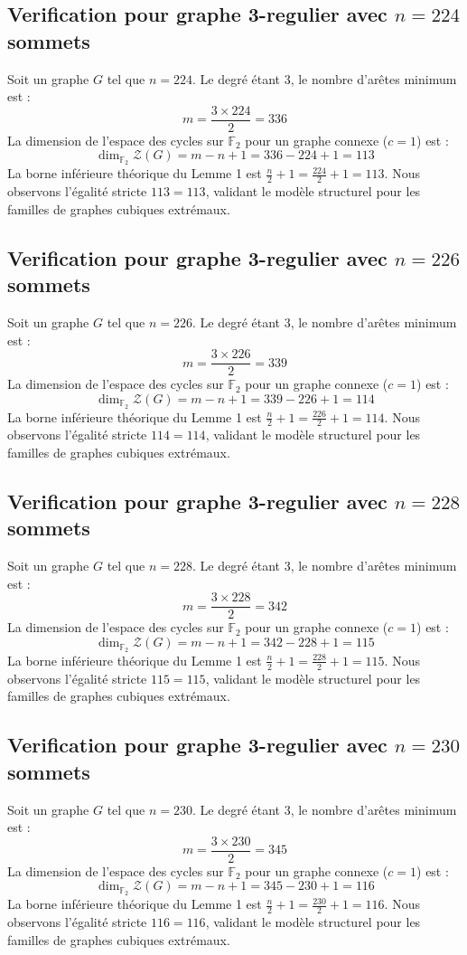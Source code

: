 \documentclass[11pt,a4paper]{article}
\begin{document}
\subsection{Verification pour graphe 3-regulier avec $n=224$ sommets}
Soit un graphe $G$ tel que $n = 224$. Le degré étant 3, le nombre d'arêtes minimum est :
$$ m = \frac{3 \times 224}{2} = 336 $$
La dimension de l'espace des cycles sur $\mathbb{F}_2$ pour un graphe connexe ($c=1$) est :
$$ \dim_{\mathbb{F}_2} \mathcal{Z}(G) = m - n + 1 = 336 - 224 + 1 = 113 $$
La borne inférieure théorique du Lemme 1 est $\frac{n}{2} + 1 = \frac{224}{2} + 1 = 113$.
Nous observons l'égalité stricte $113 = 113$, validant le modèle structurel pour les familles de graphes cubiques extrémaux.

\subsection{Verification pour graphe 3-regulier avec $n=226$ sommets}
Soit un graphe $G$ tel que $n = 226$. Le degré étant 3, le nombre d'arêtes minimum est :
$$ m = \frac{3 \times 226}{2} = 339 $$
La dimension de l'espace des cycles sur $\mathbb{F}_2$ pour un graphe connexe ($c=1$) est :
$$ \dim_{\mathbb{F}_2} \mathcal{Z}(G) = m - n + 1 = 339 - 226 + 1 = 114 $$
La borne inférieure théorique du Lemme 1 est $\frac{n}{2} + 1 = \frac{226}{2} + 1 = 114$.
Nous observons l'égalité stricte $114 = 114$, validant le modèle structurel pour les familles de graphes cubiques extrémaux.

\subsection{Verification pour graphe 3-regulier avec $n=228$ sommets}
Soit un graphe $G$ tel que $n = 228$. Le degré étant 3, le nombre d'arêtes minimum est :
$$ m = \frac{3 \times 228}{2} = 342 $$
La dimension de l'espace des cycles sur $\mathbb{F}_2$ pour un graphe connexe ($c=1$) est :
$$ \dim_{\mathbb{F}_2} \mathcal{Z}(G) = m - n + 1 = 342 - 228 + 1 = 115 $$
La borne inférieure théorique du Lemme 1 est $\frac{n}{2} + 1 = \frac{228}{2} + 1 = 115$.
Nous observons l'égalité stricte $115 = 115$, validant le modèle structurel pour les familles de graphes cubiques extrémaux.

\subsection{Verification pour graphe 3-regulier avec $n=230$ sommets}
Soit un graphe $G$ tel que $n = 230$. Le degré étant 3, le nombre d'arêtes minimum est :
$$ m = \frac{3 \times 230}{2} = 345 $$
La dimension de l'espace des cycles sur $\mathbb{F}_2$ pour un graphe connexe ($c=1$) est :
$$ \dim_{\mathbb{F}_2} \mathcal{Z}(G) = m - n + 1 = 345 - 230 + 1 = 116 $$
La borne inférieure théorique du Lemme 1 est $\frac{n}{2} + 1 = \frac{230}{2} + 1 = 116$.
Nous observons l'égalité stricte $116 = 116$, validant le modèle structurel pour les familles de graphes cubiques extrémaux.
\end{document}
